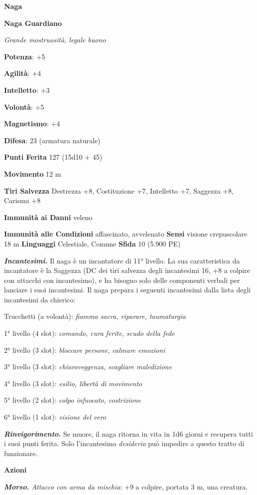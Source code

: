 \begin{multicols}{2}
\textbf{Naga}

\textbf{Naga Guardiano}

\emph{Grande mostruosità, legale buono}

\textbf{Potenza}: +5

\textbf{Agilità}: +4

\textbf{Intelletto}: +3

\textbf{Volontà}: +5

\textbf{Magnetismo}: +4

\textbf{Difesa}: 23 (armatura naturale)

\textbf{Punti Ferita} 127 (15d10 + 45)

\textbf{Movimento} 12 m

\textbf{Tiri Salvezza} Destrezza +8, Costituzione +7, Intelletto +7,
Saggezza +8, Carisma +8

\textbf{Immunità ai Danni} veleno

\textbf{Immunità alle Condizioni} affascinato, avvelenato \textbf{Sensi}
visione crepuscolare 18 m \textbf{Linguaggi} Celestiale,
Comune \textbf{Sfida} 10 (5.900 PE)

\emph{\textbf{Incantesimi.}} Il naga è un incantatore di 11° livello. La
sua caratteristica da incantatore è la Saggezza (DC dei tiri salvezza
degli incantesimi 16, +8 a colpire con attacchi con incantesimo), e ha
bisogno solo delle componenti verbali per lanciare i suoi incantesimi.
Il naga prepara i seguenti incantesimi dalla lista degli incantesimi da
chierico:

Trucchetti (a volontà): \emph{fiamma sacra, riparare, taumaturgia}

1° livello (4 slot): \emph{comando, cura ferite, scudo della fede}

2° livello (3 slot): \emph{bloccare persone, calmare emozioni}

3° livello (3 slot): \emph{chiaroveggenza, scagliare maledizione}

4° livello (3 slot): \emph{esilio, libertà di movimento}

5° livello (2 slot): \emph{colpo infuocato, costrizione}

6° livello (1 slot): \emph{visione del vero}

\emph{\textbf{Rinvigorimento.}} Se muore, il naga ritorna in vita in 1d6
giorni e recupera tutti i suoi punti ferita. Solo l'incantesimo
\emph{desiderio} può impedire a questo tratto di funzionare.

\textbf{Azioni}

\emph{\textbf{Morso.} Attacco con arma da mischia}: +9 a colpire,
portata 3 m, una creatura.


\end{multicols}
